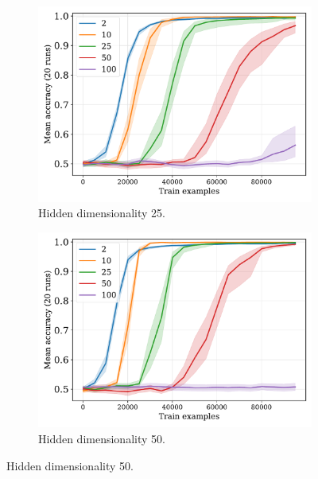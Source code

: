 \begin{figure}[H]
  \begin{subfigure}{0.45\linewidth}
    \includegraphics[width=1\textwidth]{../fig/flatpremack-h2-train_size-embed_dim-hidden_dim=25.pdf}
    \caption{Hidden dimensionality 25.}
  \end{subfigure}
  \hfill
  \begin{subfigure}{0.45\linewidth}
    \includegraphics[width=1\textwidth]{../fig/flatpremack-h2-train_size-embed_dim-hidden_dim=50.pdf}
    \caption{Hidden dimensionality 50.}
  \end{subfigure}

  \vspace{24pt}


\end{figure}
